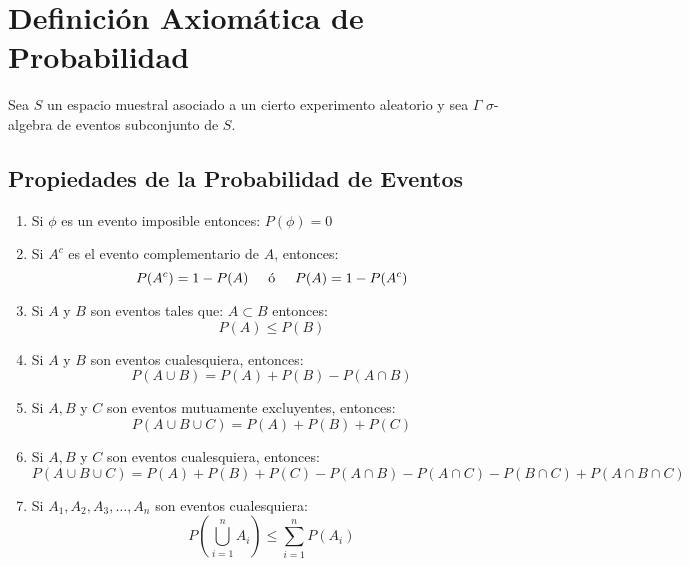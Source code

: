 \section{Definición Axiomática de Probabilidad}
Sea $S$ un espacio muestral asociado a un cierto experimento aleatorio y sea $\Gamma$ $\sigma$-algebra de eventos subconjunto de $S$.
\subsection{Propiedades de la Probabilidad de Eventos}
\begin{enumerate}
\item Si $\phi$ es un evento imposible entonces: $P(\phi)=0$
\item Si $A^c$ es el evento complementario de $A$, entonces:
$$P(A^c)=1-P(A) \hspace{0.5cm} \textrm{ó} \hspace{0.5cm}  P(A)=1-P(A^c)$$
\item Si $A$ y $B$ son eventos tales que: $A\subset B$ entonces:
$$P(A)\leq P(B)$$
\item Si $A$ y $B$ son eventos cualesquiera, entonces:
$$P(A\cup B)=P(A)+P(B)-P(A\cap B)$$
\item Si $A,B$ y $C$ son eventos mutuamente excluyentes, entonces:
$$P(A\cup B \cup C) = P(A)+P(B)+P(C)$$
\item Si $A,B$ y $C$ son eventos cualesquiera, entonces:
$$P(A\cup B \cup C) = P(A)+P(B)+P(C) - P(A\cap B)-P(A\cap C)-P(B\cap C)+P(A\cap B\cap C)$$
\item Si $A_1,A_2,A_3,\ldots,A_n$ son eventos cualesquiera:
$$ P\left( \bigcup\limits_{i=1}^{n} A_i\right)   \leq \sum_{i=1}^{n}P(A_i)$$
\end{enumerate}